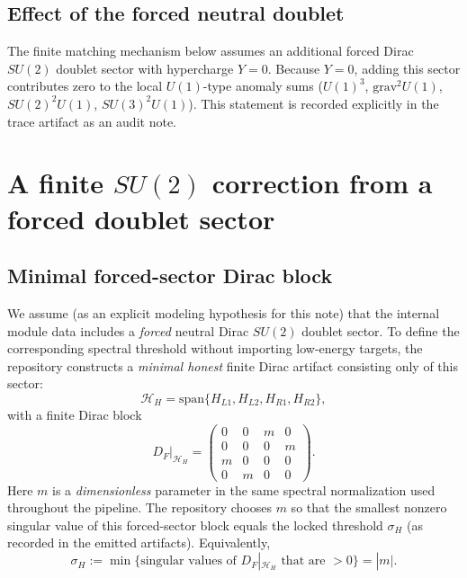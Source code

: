 \documentclass[11pt]{article}
\begin{document}
\subsection{Effect of the forced neutral doublet}
The finite matching mechanism below assumes an additional forced Dirac $SU(2)$ doublet sector with hypercharge $Y=0$. Because $Y=0$, adding this sector contributes zero to the local $U(1)$-type anomaly sums ($U(1)^3$, $\mathrm{grav}^2U(1)$, $SU(2)^2U(1)$, $SU(3)^2U(1)$). This statement is recorded explicitly in the trace artifact as an audit note.

\section{A finite \texorpdfstring{$SU(2)$}{SU(2)} correction from a forced doublet sector}
\subsection{Minimal forced-sector Dirac block}
We assume (as an explicit modeling hypothesis for this note) that the internal module data includes a \emph{forced} neutral Dirac $SU(2)$ doublet sector. To define the corresponding spectral threshold without importing low-energy targets, the repository constructs a \emph{minimal honest} finite Dirac artifact consisting only of this sector:
\begin{equation}
\mathcal{H}_H = \mathrm{span}\{H_{L1},H_{L2},H_{R1},H_{R2}\},
\end{equation}
with a finite Dirac block
\begin{equation}
D_F\big|_{\mathcal{H}_H} =
\begin{pmatrix}
0 & 0 & m & 0\\
0 & 0 & 0 & m\\
m & 0 & 0 & 0\\
0 & m & 0 & 0
\end{pmatrix}.
\end{equation}
Here $m$ is a \emph{dimensionless} parameter in the same spectral normalization used throughout the pipeline. The repository chooses $m$ so that the smallest nonzero singular value of this forced-sector block equals the locked threshold $\sigma_H$ (as recorded in the emitted artifacts). Equivalently,
\begin{equation}
\sigma_H := \min\{\text{singular values of } D_F|_{\mathcal{H}_H} \text{ that are } > 0\} = |m|.
\end{equation}
\end{document}
